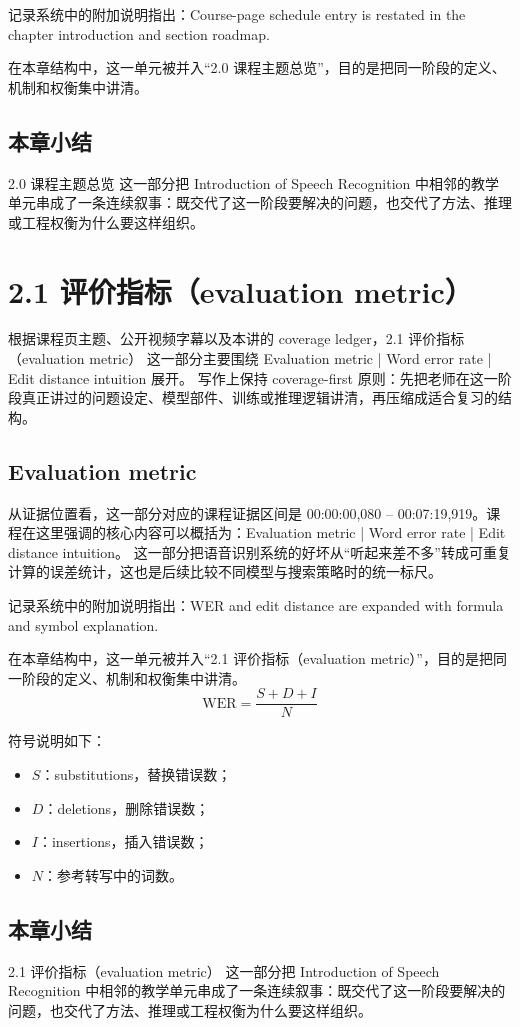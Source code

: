 \documentclass[a4paper]{article}
\begin{document}
记录系统中的附加说明指出：Course-page schedule entry is restated in the chapter introduction and section roadmap.

在本章结构中，这一单元被并入“2.0 课程主题总览”，目的是把同一阶段的定义、机制和权衡集中讲清。

\subsection{本章小结}
2.0 课程主题总览 这一部分把 Introduction of Speech Recognition 中相邻的教学单元串成了一条连续叙事：既交代了这一阶段要解决的问题，也交代了方法、推理或工程权衡为什么要这样组织。

\section{2.1 评价指标（evaluation metric）}
根据课程页主题、公开视频字幕以及本讲的 coverage ledger，2.1 评价指标（evaluation metric） 这一部分主要围绕 Evaluation metric | Word error rate | Edit distance intuition 展开。
写作上保持 coverage-first 原则：先把老师在这一阶段真正讲过的问题设定、模型部件、训练或推理逻辑讲清，再压缩成适合复习的结构。

\subsection{Evaluation metric}
从证据位置看，这一部分对应的课程证据区间是 00:00:00,080 -- 00:07:19,919。课程在这里强调的核心内容可以概括为：Evaluation metric | Word error rate | Edit distance intuition。
这一部分把语音识别系统的好坏从“听起来差不多”转成可重复计算的误差统计，这也是后续比较不同模型与搜索策略时的统一标尺。

记录系统中的附加说明指出：WER and edit distance are expanded with formula and symbol explanation.

在本章结构中，这一单元被并入“2.1 评价指标（evaluation metric）”，目的是把同一阶段的定义、机制和权衡集中讲清。
\[
\mathrm{WER} = \frac{S + D + I}{N}
\]

符号说明如下：
\begin{itemize}
\item $S$：substitutions，替换错误数；
\item $D$：deletions，删除错误数；
\item $I$：insertions，插入错误数；
\item $N$：参考转写中的词数。
\end{itemize}

\subsection{本章小结}
2.1 评价指标（evaluation metric） 这一部分把 Introduction of Speech Recognition 中相邻的教学单元串成了一条连续叙事：既交代了这一阶段要解决的问题，也交代了方法、推理或工程权衡为什么要这样组织。
\end{document}
